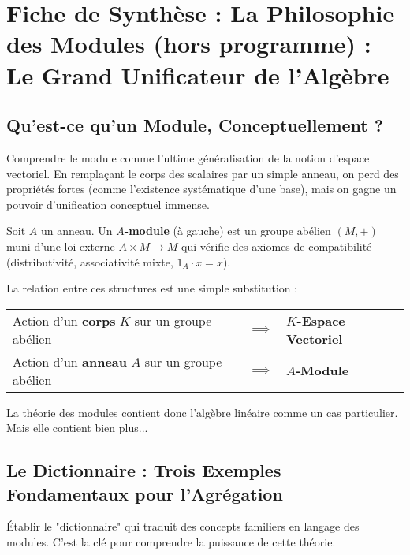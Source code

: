 \chapter{Fiche de Synthèse : La Philosophie des Modules (hors programme) : Le Grand Unificateur de l'Algèbre}

\section{Qu'est-ce qu'un Module, Conceptuellement ?}

\begin{objectif}
    Comprendre le module comme l'ultime généralisation de la notion d'espace vectoriel. En remplaçant le corps des scalaires par un simple anneau, on perd des propriétés fortes (comme l'existence systématique d'une base), mais on gagne un pouvoir d'unification conceptuel immense.
\end{objectif}

\begin{definition}
    Soit $A$ un anneau. Un \textbf{$A$-module} (à gauche) est un groupe abélien $(M,+)$ muni d'une loi externe $A \times M \to M$ qui vérifie des axiomes de compatibilité (distributivité, associativité mixte, $1_A \cdot x = x$).
\end{definition}

\begin{remark}
    La relation entre ces structures est une simple substitution :
    \begin{center}
    \begin{tabular}{lcl}
         Action d'un \textbf{corps} $K$ sur un groupe abélien & $\implies$ & \textbf{$K$-Espace Vectoriel} \\
         Action d'un \textbf{anneau} $A$ sur un groupe abélien & $\implies$ & \textbf{$A$-Module}
    \end{tabular}
    \end{center}
    La théorie des modules contient donc l'algèbre linéaire comme un cas particulier. Mais elle contient bien plus...
\end{remark}

\section{Le Dictionnaire : Trois Exemples Fondamentaux pour l'Agrégation}

\begin{objectif}
    Établir le "dictionnaire" qui traduit des concepts familiers en langage des modules. C'est la clé pour comprendre la puissance de cette théorie.
\end{objectif}

